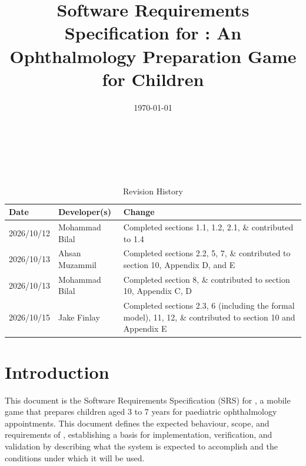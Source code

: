 \documentclass[12pt]{article}
\begin{document}
\title{Software Requirements Specification for \progname: An Ophthalmology Preparation Game for Children} 
\author{\authname}
\date{\today}
	
\maketitle

~\newpage


\tableofcontents

~\newpage

\begin{table}[hp]
\caption{Revision History} \label{TblRevisionHistory}
\begin{tabularx}{\textwidth}{llX}
\toprule
\textbf{Date} & \textbf{Developer(s)} & \textbf{Change}\\
\midrule
2026/10/12 & Mohammad Bilal & Completed sections 1.1, 1.2, 2.1, \& contributed to 1.4 \\
2026/10/13 & Ahsan Muzammil & Completed sections 2.2, 5, 7, \& contributed to section 10, Appendix D, and E \\
2026/10/13 & Mohammad Bilal & Completed section 8, \& contributed to section 10, Appendix C, D \\
2026/10/15 & Jake Finlay & Completed sections 2.3, 6 (including the formal model), 11, 12, \& contributed to section 10 and Appendix E \\
\bottomrule
\end{tabularx}
\end{table}

\newpage


\section{Introduction} 

This document is the Software Requirements Specification (SRS) for \progname{}, a mobile game
that prepares children aged 3 to 7 years for paediatric ophthalmology appointments.
This document defines the expected behaviour, scope, and requirements of \progname{},
establishing a basis for implementation, verification, and validation by describing what the system
is expected to accomplish and the conditions under which it will be used.
\end{document}
